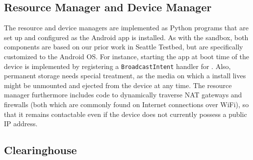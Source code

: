 \begin{comment}
The contract on line 11 - 17 defines that the target
for \path{get_location()} is \path{restricted_get_location()}. If 
\path{restrict_location} is the first descendant of the sandbox kernel, then
\path{restricted_get_location()} will replace the \path{get_location()}
in the sandbox virtual namespace. If there is a preceding blurring layer 
before \path{restrict_location} that already updated its 
function mapping for \path{get_location()} (like \path{blur_to_city}  
in Section~\ref{sec-precision-example}), then
\path{restricted_get_location()} will replace the \path{get_location()} call
with the policy implemented in this preceding blurring layer. In this case, 
the experiment code will get location updates once per 10 minutes, at
the city level. 

\bigskip
\end{comment}



\subsection{Resource Manager and Device Manager}
The \sysname resource and device managers are implemented as Python 
programs that are set up and configured as the \sysname Android app 
is installed. As with the sandbox, both components are based on our 
prior work in Seattle Testbed, but are specifically customized to 
the Android OS. For instance, starting the app at boot time of the 
device is implemented by registering a \texttt{BroadcastIntent} handler 
for . Also, permanent storage needs 
special treatment, as the media on which a \sysname install lives 
might be unmounted and ejected from the device at any time.
The resource manager furthermore includes code to dynamically 
traverse NAT gateways and firewalls (both which are commonly found 
on Internet connections over WiFi), so that it remains contactable 
even if the device does not currently possess a public IP address.


\subsection{Clearinghouse}

